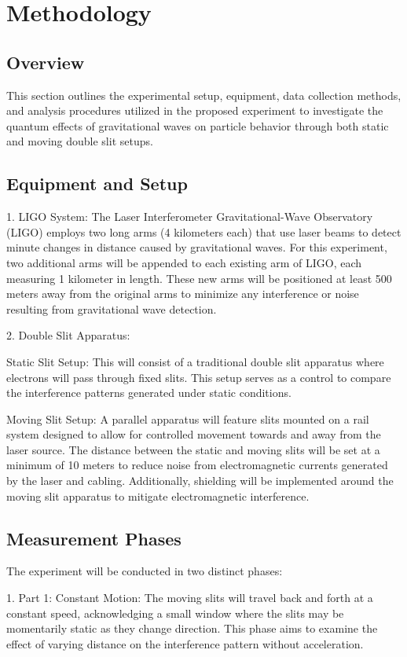 \documentclass{article}
\begin{document}
\section{Methodology}

\subsection{Overview}
This section outlines the experimental setup, equipment, data collection methods, and analysis procedures utilized in the proposed experiment to investigate the quantum effects of gravitational waves on particle behavior through both static and moving double slit setups.

\subsection{Equipment and Setup}
1. LIGO System: The Laser Interferometer Gravitational-Wave Observatory (LIGO) employs two long arms (4 kilometers each) that use laser beams to detect minute changes in distance caused by gravitational waves. For this experiment, two additional arms will be appended to each existing arm of LIGO, each measuring 1 kilometer in length. These new arms will be positioned at least 500 meters away from the original arms to minimize any interference or noise resulting from gravitational wave detection.

2. Double Slit Apparatus:

Static Slit Setup: This will consist of a traditional double slit apparatus where electrons will pass through fixed slits. This setup serves as a control to compare the interference patterns generated under static conditions.

Moving Slit Setup: A parallel apparatus will feature slits mounted on a rail system designed to allow for controlled movement towards and away from the laser source. The distance between the static and moving slits will be set at a minimum of 10 meters to reduce noise from electromagnetic currents generated by the laser and cabling. Additionally, shielding will be implemented around the moving slit apparatus to mitigate electromagnetic interference.

\subsection{Measurement Phases}
The experiment will be conducted in two distinct phases:

1. Part 1: Constant Motion: The moving slits will travel back and forth at a constant speed, acknowledging a small window where the slits may be momentarily static as they change direction. This phase aims to examine the effect of varying distance on the interference pattern without acceleration.
\end{document}
